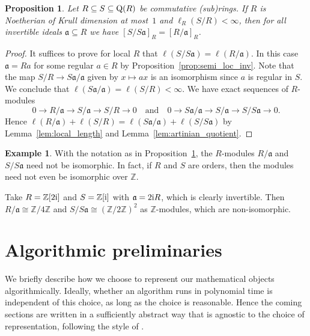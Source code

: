 \documentclass{amsart}
\theoremstyle{plain}
\newtheorem{proposition}[theorem]{Proposition}
\theoremstyle{definition}
\newtheorem{example}[theorem]{Example}
\newcommand{\Z}{\ensuremath{\mathbb{Z}}}
\newcommand{\ii}{\textup{i}}
\begin{document}
\begin{proposition}\label{prop:invertible_ideal_finite_extension}
Let \(R\subseteq S\subseteq\textup{Q}(R)\) be commutative (sub)rings. If \(R\) is Noetherian of Krull dimension at most~\(1\) and \(\ell_R(S/R)<\infty\), then for all invertible ideals \(\mathfrak{a}\subseteq R\) we have \([S/S\mathfrak{a}]_R=[R/\mathfrak{a}]_R\).
\end{proposition}
\begin{proof}
It suffices to prove for local \(R\) that \(\ell(S/S\mathfrak{a})=\ell(R/\mathfrak{a})\).
In this case \(\mathfrak{a}=Ra\) for some regular \(a\in R\) by Proposition~\ref{prop:semi_loc_inv}.
Note that the map \(S/R \to S\mathfrak{a}/ \mathfrak{a}\) given by \(x\mapsto a x\) is an isomorphism since \(a\) is regular in \(S\).
We conclude that \(\ell(S\mathfrak{a}/\mathfrak{a})=\ell(S/R)<\infty\).
We have exact sequences of \(R\)-modules
\[0\to R/\mathfrak{a} \to S/\mathfrak{a} \to S/R\to 0 \quad\text{and}\quad 0\to S\mathfrak{a}/\mathfrak{a}\to S/\mathfrak{a}\to S/S\mathfrak{a}\to 0.\]
Hence \(\ell(R/\mathfrak{a})+\ell(S/R)=\ell(S\mathfrak{a}/\mathfrak{a})+\ell(S/S\mathfrak{a})\) by Lemma~\ref{lem:local_length} and Lemma~\ref{lem:artinian_quotient}.
\end{proof}

\begin{example}
With the notation as in Proposition~\ref{prop:invertible_ideal_finite_extension}, the \(R\)-modules \(R/\mathfrak{a}\) and \(S/S\mathfrak{a}\) need not be  isomorphic. 
In fact, if \(R\) and \(S\) are orders, then the modules need not even be isomorphic over \(\Z\).

Take \(R=\Z[2\ii]\) and \(S=\Z[\ii]\) with \(\mathfrak{a}=2\ii R\), which is clearly invertible.
Then \(R/\mathfrak{a}\cong \Z/4\Z\) and \(S/S\mathfrak{a} \cong (\Z/2\Z)^2\) as \(\Z\)-modules, which are non-isomorphic.
\end{example}


\section{Algorithmic preliminaries}\label{sec:algorithmic_clich_e}

We briefly describe how we choose to represent our mathematical objects algorithmically.
Ideally, whether an algorithm runs in polynomial time is independent of this choice, as long as the choice is reasonable. Hence the coming sections are written in a sufficiently abstract way that is agnostic to the choice of representation, following the style of \cite{Lenstra_algorithms}.
\end{document}
